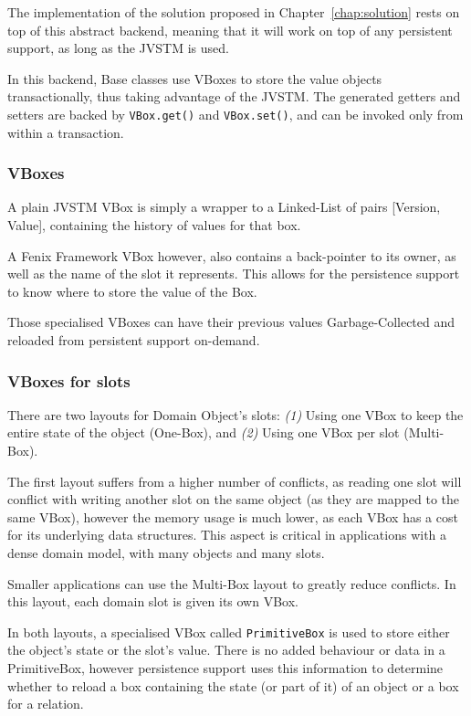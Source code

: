 \documentclass{llncs}
\begin{document}
The implementation of the solution proposed in
Chapter~\ref{chap:solution} rests on top of this abstract backend,
meaning that it will work on top of any persistent support, as long as
the JVSTM is used.

In this backend, Base classes use VBoxes to store the value objects
transactionally, thus taking advantage of the JVSTM. The generated
getters and setters are backed by \texttt{VBox.get()} and
\texttt{VBox.set()}, and can be invoked only from within a
transaction.

\subsubsection{VBoxes}

A plain JVSTM VBox is simply a wrapper to a Linked-List of pairs
[Version, Value], containing the history of values for that box.

A Fenix Framework VBox however, also contains a back-pointer to its
owner, as well as the name of the slot it represents. This allows for
the persistence support to know where to store the value of the Box.

Those specialised VBoxes can have their previous values
Garbage-Collected and reloaded from persistent support on-demand.

\subsubsection{VBoxes for slots}

There are two layouts for Domain Object's slots: {\it (1)} Using one
VBox to keep the entire state of the object (One-Box), and {\it (2)}
Using one VBox per slot (Multi-Box).

The first layout suffers from a higher number of conflicts, as reading
one slot will conflict with writing another slot on the same object
(as they are mapped to the same VBox), however the memory usage is
much lower, as each VBox has a cost for its underlying data
structures. This aspect is critical in applications with a dense
domain model, with many objects and many slots.

Smaller applications can use the Multi-Box layout to greatly reduce
conflicts. In this layout, each domain slot is given its own VBox.

In both layouts, a specialised VBox called \texttt{PrimitiveBox} is
used to store either the object's state or the slot's value. There is
no added behaviour or data in a PrimitiveBox, however persistence
support uses this information to determine whether to reload a box
containing the state (or part of it) of an object or a box for a relation.
\end{document}
